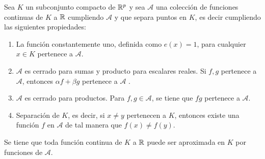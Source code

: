 \begin{teorema} 

    Sea $K$ un subconjunto compacto de $\mathbb{R}^p$ y sea $\mathcal{A}$ una colección de 
    funciones continuas de $K$ a $\mathbb{R}$ cumpliendo $\mathcal{A}$ y 
    que separa puntos en $K$, es decir cumpliendo las siguientes propiedades: 

    \begin{enumerate}
        \item La función constantemente uno, definida como $e(x)=1$, para cualquier $x\in K$ pertenece a $\mathcal{A}$.
        \item $\mathcal{A}$ es cerrado para sumas y producto para escalares reales. Si $f,g$ pertenece a  $\mathcal{A}$, entonces $\alpha f + \beta g$ pertenece a $\mathcal{A}$ . 
        \item $\mathcal{A}$ es cerrado para productos. Para $f,g \in \mathcal A$, se tiene que $fg$ pertenece a $\mathcal{A}$. 
        \item Separación de $K$, es decir, si $x \neq y$ pertenecen a $K$, entonces existe una función $f$ en $\mathcal{A}$  de tal manera que $f(x) \neq f(y)$. 
    \end{enumerate}
    
    Se tiene que toda función continua de $K$ a $\mathbb{R}$ puede ser aproximada en $K$ por funciones de $\mathcal A$. 

\end{teorema}  

